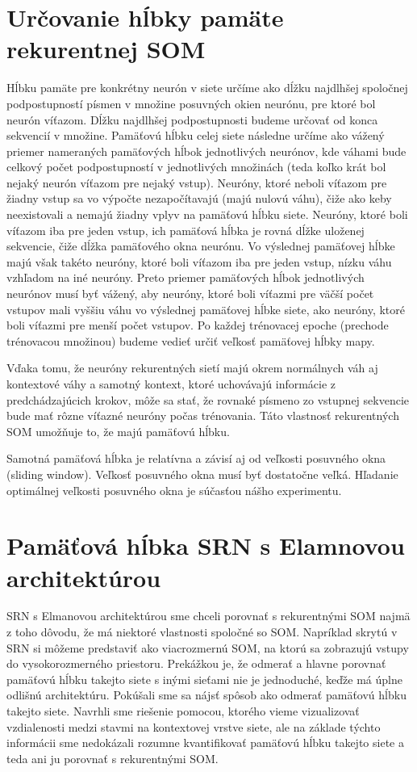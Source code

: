 \section{Určovanie hĺbky pamäte rekurentnej SOM}
Hĺbku pamäte pre konkrétny neurón v siete určíme ako dĺžku najdlhšej spoločnej
podpostupností písmen v množine posuvných okien neurónu, pre ktoré bol neurón víťazom.
Dĺžku najdlhšej podpostupnosti budeme určovať od konca sekvencií v množine.
Pamäťovú hĺbku celej siete následne určíme ako vážený priemer nameraných pamäťových hĺbok jednotlivých neurónov, 
kde váhami bude celkový počet podpostupností v jednotlivých množinách (teda koľko krát bol nejaký neurón víťazom pre nejaký vstup).
Neuróny, ktoré neboli víťazom pre žiadny vstup sa vo výpočte nezapočítavajú (majú nulovú váhu), čiže ako keby neexistovali a nemajú žiadny vplyv na pamäťovú hĺbku siete.
Neuróny, ktoré boli víťazom iba pre jeden vstup, ich pamäťová hĺbka je rovná dĺžke uloženej sekvencie, čiže dĺžka pamäťového okna neurónu.
Vo výslednej pamäťovej hĺbke majú však takéto neuróny, ktoré boli víťazom iba pre jeden vstup, nízku váhu vzhľadom na iné neuróny.
Preto priemer pamäťových hĺbok jednotlivých neurónov musí byť vážený, aby neuróny, 
ktoré boli víťazmi pre väčší počet vstupov mali vyššiu váhu vo výslednej pamäťovej hĺbke siete, ako neuróny, ktoré boli víťazmi pre menší počet vstupov.
Po každej trénovacej epoche (prechode trénovacou množinou) budeme vedieť určiť veľkosť pamäťovej hĺbky mapy.

Vďaka tomu, že neuróny rekurentných sietí majú okrem normálnych váh aj kontextové váhy a samotný kontext, 
ktoré uchovávajú informácie z predchádzajúcich krokov, môže sa stať, že rovnaké písmeno zo vstupnej sekvencie 
bude mať rôzne víťazné neuróny počas trénovania. Táto vlastnosť rekurentných SOM umožňuje to, že majú pamäťovú hĺbku.

Samotná pamäťová hĺbka je relatívna a závisí aj od veľkosti posuvného okna (sliding window).
Veľkosť posuvného okna musí byť dostatočne veľká. Hľadanie optimálnej veľkosti posuvného
okna je súčasťou nášho experimentu.

\section{Pamäťová hĺbka SRN s Elamnovou architektúrou}
SRN s Elmanovou architektúrou sme chceli porovnať s rekurentnými SOM najmä z toho dôvodu, že má niektoré vlastnosti spoločné 
so SOM. Napríklad skrytú v SRN si môžeme predstaviť ako viacrozmernú SOM, na ktorú sa zobrazujú vstupy do vysokorozmerného priestoru.
Prekážkou je, že odmerať a hlavne porovnať pamäťovú hĺbku takejto siete s inými sieťami nie je jednoduché, keďže má úplne odlišnú architektúru.
Pokúšali sme sa nájsť spôsob ako odmerať pamäťovú hĺbku takejto siete.
Navrhli sme riešenie pomocou, ktorého vieme vizualizovať vzdialenosti medzi stavmi na kontextovej vrstve siete, ale
na základe týchto informácii sme nedokázali rozumne kvantifikovať pamäťovú hĺbku takejto siete a teda 
ani ju porovnať s rekurentnými SOM.



